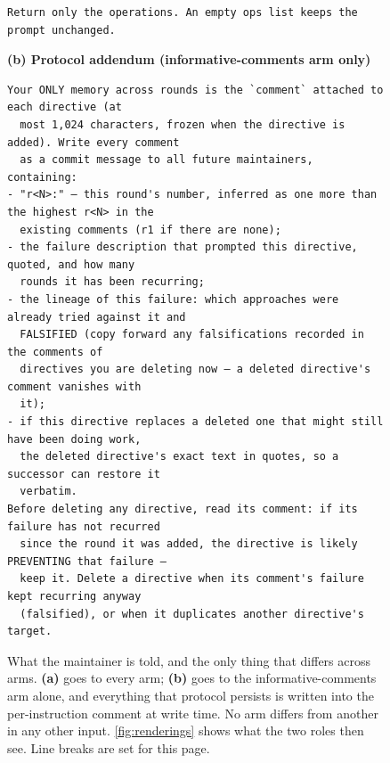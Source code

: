 \begin{figure}[t]
\begin{verbatim}
Return only the operations. An empty ops list keeps the prompt unchanged.
  \end{verbatim}
  \textbf{(b) Protocol addendum (informative-comments arm only)}
  \begin{verbatim}
Your ONLY memory across rounds is the `comment` attached to each directive (at
  most 1,024 characters, frozen when the directive is added). Write every comment
  as a commit message to all future maintainers, containing:
- "r<N>:" — this round's number, inferred as one more than the highest r<N> in the
  existing comments (r1 if there are none);
- the failure description that prompted this directive, quoted, and how many
  rounds it has been recurring;
- the lineage of this failure: which approaches were already tried against it and
  FALSIFIED (copy forward any falsifications recorded in the comments of
  directives you are deleting now — a deleted directive's comment vanishes with
  it);
- if this directive replaces a deleted one that might still have been doing work,
  the deleted directive's exact text in quotes, so a successor can restore it
  verbatim.
Before deleting any directive, read its comment: if its failure has not recurred
  since the round it was added, the directive is likely PREVENTING that failure —
  keep it. Delete a directive when its comment's failure kept recurring anyway
  (falsified), or when it duplicates another directive's target.
  \end{verbatim}
  \caption{
    What the maintainer is told, and the only thing that differs across arms. \textbf{(a)} goes to
    every arm; \textbf{(b)} goes to the informative-comments arm alone, and everything that
    protocol persists is written into the per-instruction comment at write time. No arm differs
    from another in any other input. \autoref{fig:renderings} shows what the two roles then see.
    Line breaks are set for this page.
  }
  \label{fig:prompts}
\end{figure}
